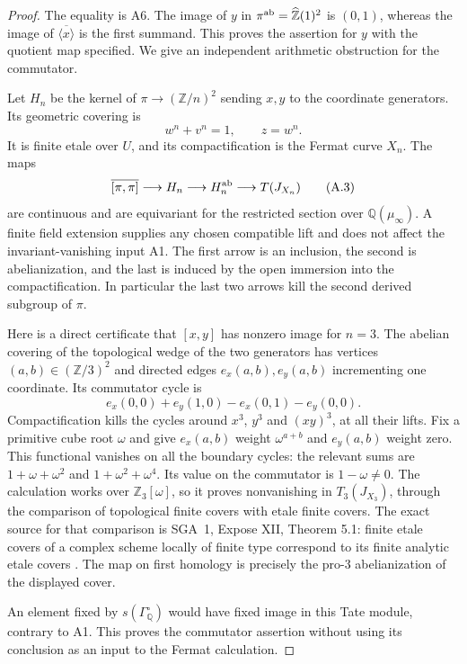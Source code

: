 \documentclass[11pt,a4paper]{article}
\begin{document}
\begin{proof}
The equality is A6. The image of $y$ in $\pi^{\rm ab}=\widehat{\mathbb Z}(1)^2$ is $(0,1)$, whereas the image of $\overline{\langle x\rangle}$ is the first summand. This proves the assertion for $y$ with the quotient map specified. We give an independent arithmetic obstruction for the commutator.

Let $H_n$ be the kernel of $\pi\to(\mathbb Z/n)^2$ sending $x,y$ to the coordinate generators. Its geometric covering is
\[
 w^n+v^n=1,\qquad z=w^n.
\]
It is finite etale over $U$, and its compactification is the Fermat curve $X_n$. The maps
\[
 \overline{[\pi,\pi]}\longrightarrow H_n\longrightarrow H_n^{\rm ab}
 \longrightarrow T(J_{X_n})
 \tag{A.3}
\]
are continuous and are equivariant for the restricted section over $\mathbb Q(\mu_\infty)$. A finite field extension supplies any chosen compatible lift and does not affect the invariant-vanishing input A1. The first arrow is an inclusion, the second is abelianization, and the last is induced by the open immersion into the compactification. In particular the last two arrows kill the second derived subgroup of $\pi$.

Here is a direct certificate that $[x,y]$ has nonzero image for $n=3$. The abelian covering of the topological wedge of the two generators has vertices $(a,b)\in(\mathbb Z/3)^2$ and directed edges $e_x(a,b),e_y(a,b)$ incrementing one coordinate. Its commutator cycle is
\[
 e_x(0,0)+e_y(1,0)-e_x(0,1)-e_y(0,0).
\]
Compactification kills the cycles around $x^3$, $y^3$ and $(xy)^3$, at all their lifts. Fix a primitive cube root $\omega$ and give $e_x(a,b)$ weight $\omega^{a+b}$ and $e_y(a,b)$ weight zero. This functional vanishes on all the boundary cycles: the relevant sums are $1+\omega+\omega^2$ and $1+\omega^2+\omega^4$. Its value on the commutator is $1-\omega\ne0$. The calculation works over $\mathbb Z_3[\omega]$, so it proves nonvanishing in $T_3(J_{X_3})$, through the comparison of topological finite covers with etale finite covers. The exact source for that comparison is SGA~1, Expose XII, Theorem 5.1: finite etale covers of a complex scheme locally of finite type correspond to its finite analytic etale covers \cite{SGA1}. The map on first homology is precisely the pro-$3$ abelianization of the displayed cover.

An element fixed by $s(\Gamma_{\mathbb Q}^{\circ})$ would have fixed image in this Tate module, contrary to A1. This proves the commutator assertion without using its conclusion as an input to the Fermat calculation.


\end{proof}
\end{document}
